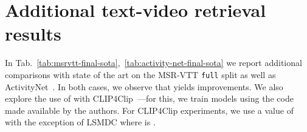 \section{Additional text-video retrieval results}
\label{additional}
In Tab.~\ref{tab:msrvtt-final-sota},~\ref{tab:activity-net-final-sota} we report additional comparisons with state of the art on the MSR-VTT \texttt{full} split as well as ActivityNet~\cite{caba2015activitynet}.
In both cases, we observe that \methodName yields improvements.
We also explore the use of \methodName with CLIP4Clip~\cite{luo2021clip4clip}---for this, we train models using the code made available by the authors.
For CLIP4Clip experiments, we use a  value of  with the exception of LSMDC where  is .
\begin{table}
\begin{center}
\end{center}
\vspace{\spacebefore{}}
\caption{\textbf{MSR-VTT full split: comparison to state of the art.}\\ denotes results obtained training using the official code.} \label{tab:msrvtt-final-sota}
\vspace{\spaceafter{}}
\end{table}

